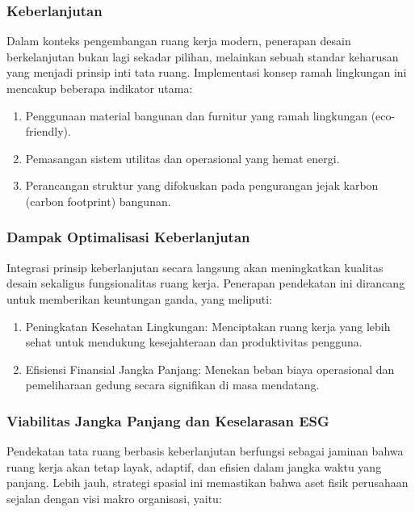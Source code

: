 \documentclass[../manperil.tex]{subfiles}
\begin{document}
\subsubsection{Keberlanjutan}%
\label{sub:Keberlanjutan}

Dalam konteks pengembangan ruang kerja modern, penerapan desain berkelanjutan bukan lagi sekadar pilihan, melainkan sebuah standar keharusan yang menjadi prinsip inti tata ruang. Implementasi konsep ramah lingkungan ini mencakup beberapa indikator utama:

\begin{enumerate}
	\item Penggunaan material bangunan dan furnitur yang ramah lingkungan (eco-friendly).
	\item Pemasangan sistem utilitas dan operasional yang hemat energi.
	\item Perancangan struktur yang difokuskan pada pengurangan jejak karbon (carbon footprint) bangunan.
\end{enumerate}

\subsubsection{Dampak Optimalisasi Keberlanjutan}%
\label{ssub:dampak_optimalisasi_keberlanjutan}

Integrasi prinsip keberlanjutan secara langsung akan meningkatkan kualitas desain sekaligus fungsionalitas ruang kerja. Penerapan pendekatan ini dirancang untuk memberikan keuntungan ganda, yang meliputi:

\begin{enumerate}
	\item Peningkatan Kesehatan Lingkungan: Menciptakan ruang kerja yang lebih sehat untuk mendukung kesejahteraan dan produktivitas pengguna.
	\item Efisiensi Finansial Jangka Panjang: Menekan beban biaya operasional dan pemeliharaan gedung secara signifikan di masa mendatang.
\end{enumerate}

\subsubsection{Viabilitas Jangka Panjang dan Keselarasan ESG}%
\label{ssub:viabilitas_jangka_panjang_dan_keselarasan_esg}

Pendekatan tata ruang berbasis keberlanjutan berfungsi sebagai jaminan bahwa ruang kerja akan tetap layak, adaptif, dan efisien dalam jangka waktu yang panjang. Lebih jauh, strategi spasial ini memastikan bahwa aset fisik perusahaan sejalan dengan visi makro organisasi, yaitu:
\end{document}

